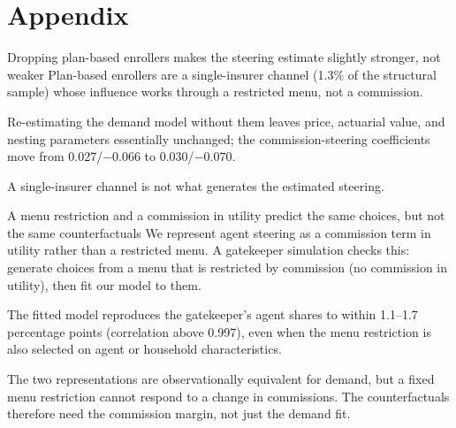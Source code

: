 \documentclass[aspectratio=169,11pt]{beamer}
\begin{document}
% 
% 


\appendix
\section{Appendix}

\begin{frame}{Dropping plan-based enrollers makes the steering estimate slightly stronger, not weaker}
  Plan-based enrollers are a single-insurer channel (1.3\% of the structural sample) whose influence works through a restricted menu, not a commission.

  \vspace{0.3cm}
  Re-estimating the demand model without them leaves price, actuarial value, and nesting parameters essentially unchanged; the commission-steering coefficients move from 0.027/$-0.066$ to 0.030/$-0.070$.

  \vspace{0.3cm}
  A single-insurer channel is not what generates the estimated steering.
\end{frame}

\begin{frame}{A menu restriction and a commission in utility predict the same choices, but not the same counterfactuals}
  We represent agent steering as a commission term in utility rather than a restricted menu. A gatekeeper simulation checks this: generate choices from a menu that is restricted by commission (no commission in utility), then fit our model to them.

  \vspace{0.3cm}
  The fitted model reproduces the gatekeeper's agent shares to within 1.1--1.7 percentage points (correlation above 0.997), even when the menu restriction is also selected on agent or household characteristics.

  \vspace{0.3cm}
  The two representations are observationally equivalent for demand, but a fixed menu restriction cannot respond to a change in commissions. The counterfactuals therefore need the commission margin, not just the demand fit.
\end{frame}
\end{document}
